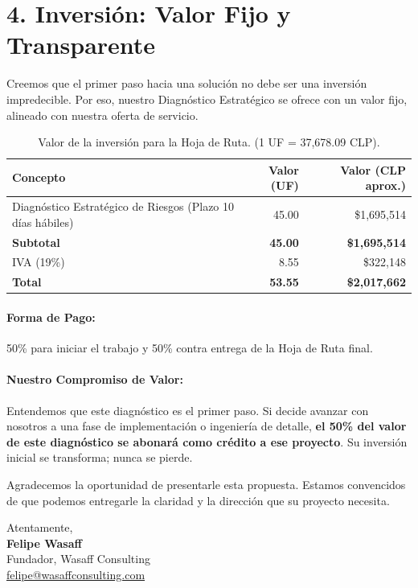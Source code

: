 \documentclass[a4paper,11pt]{article}
\begin{document}
\section*{4. Inversión: Valor Fijo y Transparente}
Creemos que el primer paso hacia una solución no debe ser una inversión impredecible. Por eso, nuestro Diagnóstico Estratégico se ofrece con un valor fijo, alineado con nuestra oferta de servicio.

\begin{table}[h!]
\centering
\begin{tabular}{lrr}
    \toprule
    \textbf{Concepto} & \textbf{Valor (UF)} & \textbf{Valor (CLP aprox.)} \\
    \midrule
    Diagnóstico Estratégico de Riesgos (Plazo 10 días hábiles) & 45.00 & \$1,695,514 \\
    \midrule
    \textbf{Subtotal} & \textbf{45.00} & \textbf{\$1,695,514} \\
    IVA (19\%) & 8.55 & \$322,148 \\
    \textbf{Total} & \textbf{53.55} & \textbf{\$2,017,662} \\
    \bottomrule
\end{tabular}
\caption{Valor de la inversión para la Hoja de Ruta. (1 UF = 37,678.09 CLP).}
\end{table}

\paragraph{Forma de Pago:} 50\% para iniciar el trabajo y 50\% contra entrega de la Hoja de Ruta final.

\paragraph{Nuestro Compromiso de Valor:} Entendemos que este diagnóstico es el primer paso. Si decide avanzar con nosotros a una fase de implementación o ingeniería de detalle, \textbf{el 50\% del valor de este diagnóstico se abonará como crédito a ese proyecto}. Su inversión inicial se transforma; nunca se pierde.

\vspace{1cm}
Agradecemos la oportunidad de presentarle esta propuesta. Estamos convencidos de que podemos entregarle la claridad y la dirección que su proyecto necesita.

\vspace{2cm}
\noindent
Atentamente,\\[2em]
\textbf{\textcolor{WasaffBlue}{Felipe Wasaff}}\\
Fundador, Wasaff Consulting\\
\href{mailto:felipe@wasaffconsulting.com}{felipe@wasaffconsulting.com}
\end{document}
